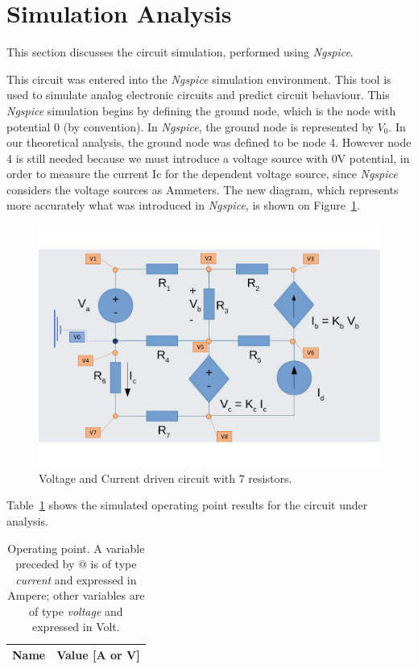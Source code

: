 \section{Simulation Analysis}
\label{sec:simulation}

\indent

This section discusses the circuit simulation, performed using {\it Ngspice}. 

This circuit was entered into the {\it Ngspice} simulation environment. This tool is used to simulate analog electronic circuits and predict circuit behaviour. 
This {\it Ngspice} simulation begins by defining the ground node, which is the node with potential 0 (by convention). In {\it Ngspice}, the ground node is represented by $V_0$. In our theoretical analysis, the ground node was defined to be node 4. However node 4 is still needed because we must introduce a voltage source with 0V potential, in order to measure the current Ic for the dependent voltage source, since {\it Ngspice} considers the voltage sources as Ammeters.
The new diagram, which represents more accurately what was introduced in {\it Ngspice}, is shown on Figure~\ref{fig:ngspiceCircuit}.

\begin{figure}[h] \centering
    \includegraphics[width=0.8\linewidth]{Images/ngspice model.pdf}
    \caption{Voltage and Current driven circuit with 7 resistors.}
    \label{fig:ngspiceCircuit}
\end{figure}





Table~\ref{tab:op} shows the simulated operating point results for the circuit
under analysis.

\begin{table}[h]
  \centering
  \begin{tabular}{|l|r|}
    \hline    
    {\bf Name} & {\bf Value [A or V]} \\ \hline
    
  \end{tabular}
  \caption{Operating point. A variable preceded by @ is of type {\em current}
    and expressed in Ampere; other variables are of type {\it voltage} and expressed in
    Volt.}
  \label{tab:op}
\end{table}







